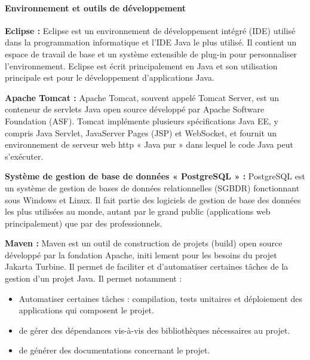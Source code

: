 \documentclass[12pt]{article}
\begin{document}
\paragraph{Environnement et outils de développement}
\begin{description}
    \item \textbf{Eclipse :} \newline
    Eclipse est un environnement de développement intégré (IDE) utilisé dans la programmation informatique et l'IDE Java le plus utilisé. Il contient un espace de travail de base et un système extensible de plug-in pour personnaliser l'environnement. Eclipse est écrit principalement en Java et son utilisation principale est pour le développement d'applications Java.
    \newline
   \item \textbf{Apache Tomcat :}    \newline
   Apache Tomcat, souvent appelé Tomcat Server, est un conteneur de servlets Java open source développé par Apache Software Foundation (ASF). Tomcat implémente plusieurs spécifications Java EE, y compris Java Servlet, JavaServer Pages (JSP) et WebSocket, et fournit un environnement de serveur web http « Java pur » dans lequel le code Java peut s’exécuter.
\newline
    \item \textbf{Système de gestion de base de données « PostgreSQL » :} \newline
    PostgreSQL est un système de gestion de bases de données relationnelles (SGBDR) fonctionnant sous Windows et Linux. Il fait partie des logiciels de gestion de base des données les plus utilisées au monde, autant par le grand public (applications web principalement) que par des professionnels.
    \newline
    \item \textbf{Maven :} \newline
    Maven est un outil de construction de projets (build) open source développé par la fondation Apache, initi lement pour les besoins du projet Jakarta Turbine. Il permet de faciliter et d'automatiser certaines tâches de la gestion d'un projet Java. Il permet notamment :
    \begin{itemize}
       
     \item Automatiser certaines tâches : compilation, tests unitaires et déploiement des applications  qui composent le projet.
     \item  de gérer des dépendances vis-à-vis des bibliothèques nécessaires au projet.
     \item  de générer des documentations concernant le projet.
     

\end{itemize}
\end{description}
\end{document}
